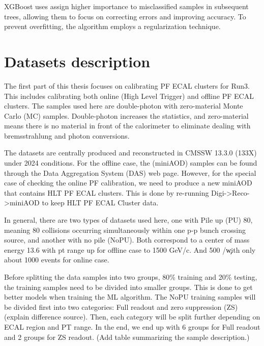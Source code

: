 XGBoost uses assign higher importance to misclassified samples in subsequent trees, allowing them to focus on correcting errors and improving accuracy.
To prevent overfitting, %
the algorithm employs a regularization technique.


\section{Datasets description}
The first part of this thesis focuses on calibrating PF ECAL clusters for Run3. This includes calibrating both online (High Level Trigger) and offline PF ECAL clusters. The samples used here are double-photon with zero-material Monte Carlo (MC) samples. Double-photon increases the statistics, and zero-material means there is no material in front of the calorimeter to eliminate dealing with bremsstrahlung and photon conversions.

The datasets are centrally produced and reconstructed in CMSSW 13.3.0 (133X) under 2024 conditions. For the offline case, the (miniAOD) samples can be found through the Data Aggregation System (DAS) web page. However, for the special case of checking the online PF calibration, we need to produce a new miniAOD that contains HLT PF ECAL clusters. This is done by re-running Digi->Reco->miniAOD to keep HLT PF ECAL Cluster data.

In general, there are two types of datasets used here, one with Pile up (PU) 80, meaning 80 collisions occurring simultaneously within one p-p bunch crossing source, and another with no pile (NoPU). Both correspond to a center of mass energy 13.6 \TeV with pt range up for offline case to 1500 GeV/c. And 500 \GeV/\c with only about 1000 events for online case.

Before splitting the data samples into two groups, 80\% training and 20\% testing, the training samples need to be divided into smaller groups. This is done to get better models when training the ML algorithm. The NoPU training samples will be divided first into two categories: Full readout and zero suppression (ZS) (explain difference source). Then, each category will be split further depending on ECAL region and PT range. In the end, we end up with 6 groups for Full readout and 2 groups for ZS readout. (Add table summarizing the sample description.)


